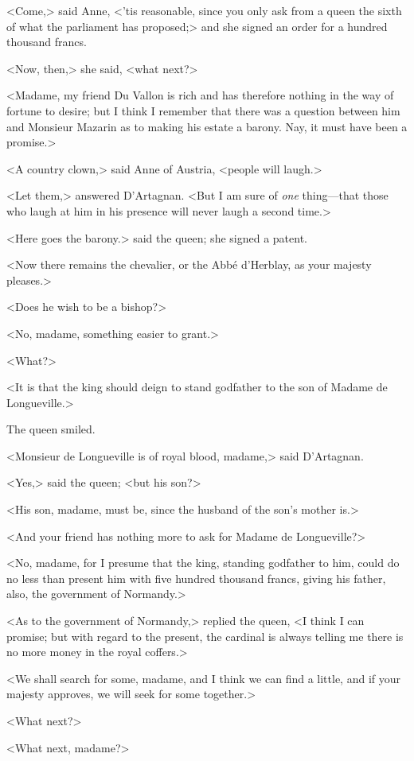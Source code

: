 <Come,> said Anne, <'tis reasonable, since you only ask from a queen the sixth of what the parliament has proposed;> and she signed an order for a hundred thousand francs.

<Now, then,> she said, <what next?>

<Madame, my friend Du Vallon is rich and has therefore nothing in the way of fortune to desire; but I think I remember that there was a question between him and Monsieur Mazarin as to making his estate a barony. Nay, it must have been a promise.>

<A country clown,> said Anne of Austria, <people will laugh.>

<Let them,> answered D'Artagnan. <But I am sure of \textit{one} thing—that those who laugh at him in his presence will never laugh a second time.>

<Here goes the barony.> said the queen; she signed a patent.

<Now there remains the chevalier, or the Abbé d'Herblay, as your majesty pleases.>

<Does he wish to be a bishop?>

<No, madame, something easier to grant.>

<What?>

<It is that the king should deign to stand godfather to the son of Madame de Longueville.>

The queen smiled.

<Monsieur de Longueville is of royal blood, madame,> said D'Artagnan.

<Yes,> said the queen; <but his son?>

<His son, madame, must be, since the husband of the son's mother is.>

<And your friend has nothing more to ask for Madame de Longueville?>

<No, madame, for I presume that the king, standing godfather to him, could do no less than present him with five hundred thousand francs, giving his father, also, the government of Normandy.>

<As to the government of Normandy,> replied the queen, <I think I can promise; but with regard to the present, the cardinal is always telling me there is no more money in the royal coffers.>

<We shall search for some, madame, and I think we can find a little, and if your majesty approves, we will seek for some together.>

<What next?>

<What next, madame?>

